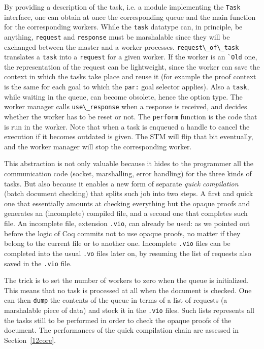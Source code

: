 \documentclass[runningheads,a4paper,oribibl]{llncs}
\newcommand{\tmverbatim}[1]{\lstinline|#1|}
\begin{document}
By providing a description of the task, i.e. a module implementing the
\tmverbatim{Task} interface, one can obtain at once the corresponding queue
and the main function for the corresponding workers. While the
\tmverbatim{task} datatype can, in principle, be anything,
\tmverbatim{request} and \tmverbatim{response} must be marshalable since they
will be exchanged between the master and a worker processes.
\tmverbatim{request\_of\_task} translates a \tmverbatim{task} into a
\tmverbatim{request} for a given worker. If the worker is an \tmverbatim{`Old}
one, the
representation of the request can be lightweight, since the worker can save
the context in which the tasks take place and reuse it (for example
the proof context is the same for each goal to which the 
\tmverbatim{par:} goal selector applies). Also a \tmverbatim{task},
while waiting in the 
queue, can become obsolete, hence the option type. The worker
manager calls \tmverbatim{use\_response} when a response is received, and
decides whether the worker has to be reset or not. The \tmverbatim{perform}
function is the code that is run in the worker. Note that when a task is
enqueued a handle to cancel the execution if it becomes outdated
is given. The STM will flip that bit eventually, and the worker manager will
stop the corresponding worker.

This abstraction is not only valuable because it hides to the programmer all
the communication code (socket, marshalling, error handling) for the three
kinds of tasks. But also because
it enables a new form of separate {\emph{quick compilation}} (batch document
checking) that splits such job into two steps. A first and quick one that
essentially amounts at checking everything but the opaque proofs and
generates an (incomplete) compiled file, and a second one that completes
such file. An incomplete file,
extension \tmverbatim{.vio}, can already be used: as we pointed out before the
logic of Coq commits not to use opaque proofs, no matter if they belong to the
current file or to another one. 
Incomplete \tmverbatim{.vio} files can be completed into the usual
\tmverbatim{.vo} files later on, by resuming the 
list of requests also saved in the
\tmverbatim{.vio} file.  

The trick is to set the number of workers to zero when the queue is
initialized. This means that no task is processed at all when the document is
checked. One can then \tmverbatim{dump} the contents of the queue in terms of
a
list of requests (a marshalable piece of data) and stock it in
the  \tmverbatim{.vio} files.  Such lists represents all the tasks
still to be performed in order to check the opaque proofs of the document. 
The performances of the quick compilation chain are assessed in
Section~\ref{12core}.
\end{document}
